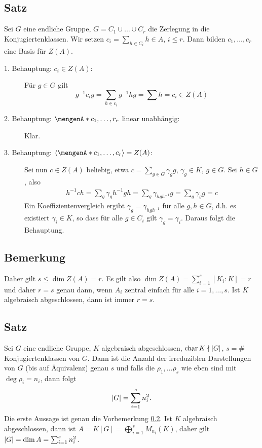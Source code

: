 \subsection{Satz} %
\label{sub:413}
Sei $G$ eine endliche Gruppe, $G= C_1 \cup \ldots \cup C_r$ die Zerlegung in die Konjugiertenklassen.
Wir setzen $c_i = \sum_{h \in C_i}h \in A$, $i \le r$. Dann bilden 
$c_1, \ldots , c_r$ eine Basis für $Z(A)$.
\begin{description}
	\item[1. Behauptung: $c_i \in Z(A)$:] Für $g \in G$ gilt 
	\[
		g ^{-1} c_i g = \sum_{h \in c_i} g ^{-1} h g = \sum h = c_i \in Z(A)
	\]
	\item[2. Behauptung: $\set{c_1,\ldots ,r_r} $ linear unabhängig:] Klar.
	\item[3. Behauptung: $\langle \set{c_1, \ldots ,c_r}\rangle=Z(A)$:] Sei nun $c \in Z(A)$ beliebig, etwa $c = \sum_{g \in G} \gamma_g g$, $\gamma_g \in K$, $g \in G$.
	Sei $h \in G$, also 
	\begin{align*}
		h ^{-1}c h = \sum_g \gamma_g h ^{-1} g h = \sum_g \gamma_{h g h ^{-1}} g = \sum_g \gamma_g g =c
	\end{align*}
	Ein Koeffizientenvergleich ergibt $\gamma_g = \gamma_{h g h ^{-1}}$ für alle $g,h \in G$, d.h. es existiert $\gamma_i \in K$, so dass
	für alle $g \in C_i$ gilt $\gamma_g= \gamma_i$. Daraus folgt die Behauptung. \bewende
\end{description}

\subsection{Bemerkung} %
\label{sub:414}
Daher gilt $s \le \dim Z(A)=r$. Es gilt also $\dim Z(A) = \sum_{i=1}^s [K_i :K]=r$ und daher $r=s$ genau dann, wenn $A_i$ zentral einfach für alle $i=1, \ldots ,s$.
Ist $K$ algebraisch abgeschlossen, dann ist immer $r=s$.

\subsection{Satz} %
\label{sub:415}
Sei $G$ eine endliche Gruppe, $K$ algebraisch abgeschlossen, $\Char K \nmid \abs*{G}$, $s = \#$Konjugiertenklassen von $G$. Dann ist die Anzahl der irreduziblen 
Darstellungen von $G$ (bis auf Äquivalenz) genau $s$ und falls die $\rho_1, \ldots \rho_s$ wie eben sind mit $\deg \rho_i = n_i$, dann folgt 
\[
	\abs*{G} = \sum_{i=1}^s  n_i^2.
\]
Die erste Aussage ist genau die Vorbemerkung \ref{sub:414}. Ist $K$ algebraisch abgeschlossen, dann ist $A= K[G] = \bigoplus_{i=1}^s M_{n_i}(K)$, daher gilt 
$\abs*{G} =\dim A = \sum_{i=1}^s n_i^2$. \bewende

